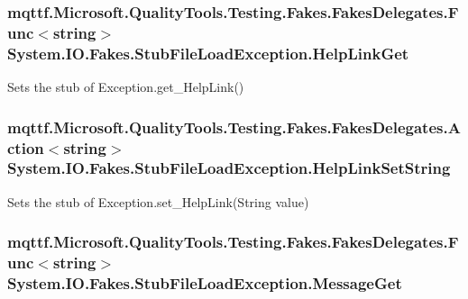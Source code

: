 \hypertarget{class_system_1_1_i_o_1_1_fakes_1_1_stub_file_load_exception_afa7e8707fb6099ba557ea02912aa45ba}{
\subsubsection[{Help\-Link\-Get}]{\setlength{\rightskip}{0pt plus 5cm}mqttf.\-Microsoft.\-Quality\-Tools.\-Testing.\-Fakes.\-Fakes\-Delegates.\-Func$<$string$>$ System.\-I\-O.\-Fakes.\-Stub\-File\-Load\-Exception.\-Help\-Link\-Get}}\label{class_system_1_1_i_o_1_1_fakes_1_1_stub_file_load_exception_afa7e8707fb6099ba557ea02912aa45ba}


Sets the stub of Exception.\-get\-\_\-\-Help\-Link()

\hypertarget{class_system_1_1_i_o_1_1_fakes_1_1_stub_file_load_exception_aaeebda11d2c43c959dc5f5b39a0cc4c2}{
\subsubsection[{Help\-Link\-Set\-String}]{\setlength{\rightskip}{0pt plus 5cm}mqttf.\-Microsoft.\-Quality\-Tools.\-Testing.\-Fakes.\-Fakes\-Delegates.\-Action$<$string$>$ System.\-I\-O.\-Fakes.\-Stub\-File\-Load\-Exception.\-Help\-Link\-Set\-String}}\label{class_system_1_1_i_o_1_1_fakes_1_1_stub_file_load_exception_aaeebda11d2c43c959dc5f5b39a0cc4c2}


Sets the stub of Exception.\-set\-\_\-\-Help\-Link(\-String value)

\hypertarget{class_system_1_1_i_o_1_1_fakes_1_1_stub_file_load_exception_a8dbd3edd7f083134ad40323579b0b7cd}{
\subsubsection[{Message\-Get}]{\setlength{\rightskip}{0pt plus 5cm}mqttf.\-Microsoft.\-Quality\-Tools.\-Testing.\-Fakes.\-Fakes\-Delegates.\-Func$<$string$>$ System.\-I\-O.\-Fakes.\-Stub\-File\-Load\-Exception.\-Message\-Get}}\label{class_system_1_1_i_o_1_1_fakes_1_1_stub_file_load_exception_a8dbd3edd7f083134ad40323579b0b7cd}


